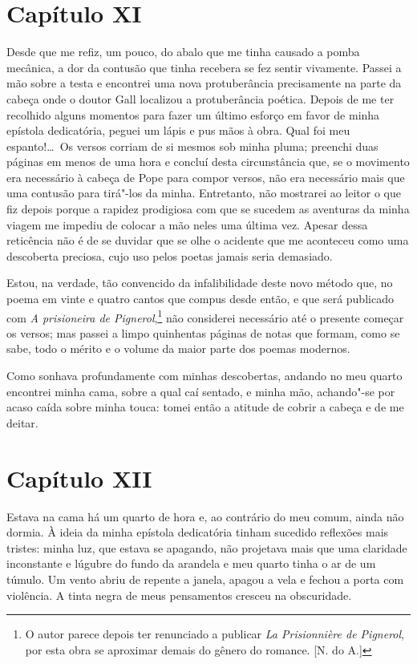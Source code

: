\section*{Capítulo XI}

  Desde que me refiz, um pouco, do abalo que me tinha causado a pomba
mecânica, a dor da contusão que tinha recebera se fez sentir vivamente.
Passei a mão sobre a testa e encontrei uma nova protuberância
precisamente na parte da cabeça onde o doutor Gall localizou a
protuberância poética. Depois de me ter recolhido alguns momentos para
fazer um último esforço em favor de minha epístola dedicatória, peguei
um lápis e pus mãos à obra. Qual foi meu espanto!\ldots\ Os versos corriam
de si mesmos sob minha pluma; preenchi duas páginas em menos de uma
hora e concluí desta circunstância que, se o movimento era necessário à
cabeça de Pope para compor versos, não era necessário mais que uma
contusão para tirá"-los da minha. Entretanto, não mostrarei ao leitor o
que fiz depois porque a rapidez prodigiosa com que se sucedem as
aventuras da minha viagem me impediu de colocar a mão neles uma última
vez. Apesar dessa reticência não é de se duvidar que se olhe o acidente
que me aconteceu como uma descoberta preciosa, cujo uso pelos poetas
jamais seria demasiado.

 Estou, na verdade, tão convencido da infalibilidade deste novo método
que, no poema em vinte e quatro cantos que compus desde então, e que
será publicado com \textit{A prisioneira de Pignerol},\footnote{ O autor
parece depois ter renunciado a publicar \textit{La Prisionnière de
Pignerol}, por esta obra se aproximar demais do gênero do romance.
[N. do A.]} não considerei necessário até o presente começar os versos; mas
passei a limpo quinhentas páginas de notas que formam, como se sabe,
todo o mérito e o volume da maior parte dos poemas modernos.

 Como sonhava profundamente com minhas descobertas, andando no meu
quarto encontrei minha cama, sobre a qual caí sentado, e minha mão,
achando"-se por acaso caída sobre minha touca: tomei então a atitude de
cobrir a cabeça e de me deitar.

\section*{Capítulo XII}

 Estava na cama há um quarto de hora e, ao contrário do meu comum, ainda
não dormia. À ideia da minha epístola dedicatória tinham sucedido
reflexões mais tristes: minha luz, que estava se apagando, não
projetava mais que uma claridade inconstante e lúgubre do fundo da
arandela e meu quarto tinha o ar de um túmulo. Um vento abriu de
repente a janela, apagou a vela e fechou a porta com violência. A tinta
negra de meus pensamentos cresceu na obscuridade.

